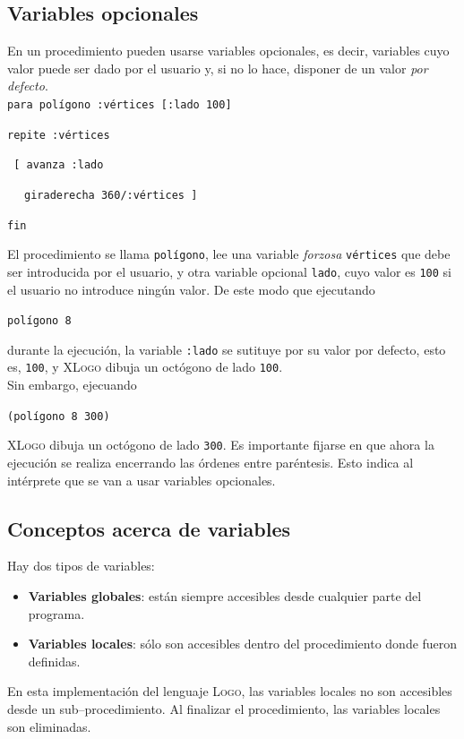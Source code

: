 \subsection{Variables opcionales}
\label{Variables_Opcionales}

En un procedimiento pueden usarse variables opcionales,
es decir, variables cuyo valor puede ser dado
por el usuario y, si no lo hace, disponer de un valor \textit{por defecto}. \\

\noindent\texttt{para pol\'igono :v\'ertices [:lado 100]}

\texttt{repite :v\'ertices}

 \texttt{ [ avanza :lado}

 \verb+ + \texttt{ giraderecha 360/:v\'ertices ]}

\noindent\texttt{fin}

\noindent El procedimiento se llama \texttt{pol\'igono}, lee una variable
\textit{forzosa} \texttt{v\'ertices} que debe ser introducida por el usuario,
y otra variable opcional \verb+lado+, cuyo valor es \verb+100+ si el usuario
no introduce ning\'un valor. De este modo que ejecutando

\texttt{pol\'igono 8} 

\noindent durante la ejecuci\'on, la variable \verb+:lado+ se sutituye por su
valor por defecto, esto es, \verb+100+, y \textsc{XLogo} dibuja un oct\'ogono
de lado \verb+100+. \\

\noindent Sin embargo, ejecuando

\texttt{(pol\'igono 8 300)}

\noindent \textsc{XLogo} dibuja un oct\'ogono de lado \verb+300+. Es
importante fijarse en que ahora la ejecuci\'on se realiza encerrando las
\'ordenes entre par\'entesis. Esto indica al int\'erprete que se van a
usar variables opcionales. 

\subsection{Conceptos acerca de variables}
   \label{Variables}

Hay dos tipos de variables:
\begin{itemize}
   \item \textbf{Variables globales}: est\'an
      siempre accesibles desde cualquier parte del programa.
   \item \textbf{Variables locales}: s\'olo son
      accesibles dentro del procedimiento donde fueron definidas.
\end{itemize}
En esta implementaci\'on del lenguaje \textsc{Logo}, las variables locales
no son accesibles desde un sub--procedimiento. Al finalizar el procedimiento,
las variables locales son eliminadas.

